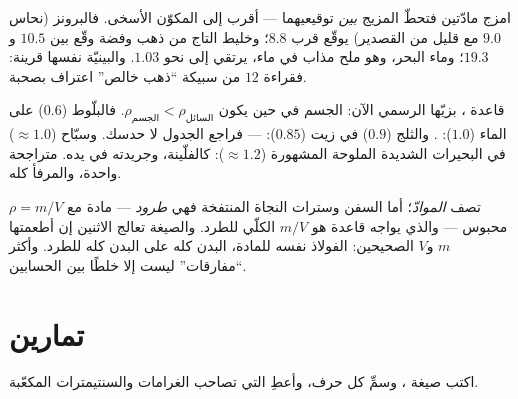 \begin{example}\label{ex:g7:volume-mass-density:alloys}
امزج مادّتين فتحطّ  المزيج \emph{بين} توقيعيهما --- أقرب
إلى المكوّن الأسخى. فالبرونز (نحاس $9.0$ مع قليل من القصدير)
يوقّع قرب $8.8$؛ وخليط التاج من ذهب وفضة وقّع بين $10.5$
و$19.3$؛ وماء البحر، وهو ملح مذاب في ماء، يرتقي إلى نحو $1.03$.
والبينيّة نفسها قرينة: فقراءة $12$ من سبيكة ``ذهب خالص''
اعتراف بصحبة.
\end{example}

\begin{example}\label{ex:g7:volume-mass-density:floating}
قاعدة ، بزيّها الرسمي الآن:  الجسم في  حين يكون
$\rho_{\text{الجسم}} < \rho_{\text{السائل}}$. فالبلّوط ($0.6$)
على الماء ($1.0$): . والثلج ($0.9$) في زيت ($0.85$): 
--- فراجع الجدول لا حدسك. وسبّاح ($\approx 1.0$) في البحيرات
الشديدة الملوحة المشهورة ($\approx 1.2$):  كالفلّينة،
وجريدته في يده. متراجحة واحدة، والمرفأ كله.
\end{example}

\begin{remark}\label{rem:g7:volume-mass-density:parcel}
$\rho = m/V$ تصف \emph{الموادّ}؛ أما السفن وسترات النجاة
المنتفخة فهي \emph{طرود} --- مادة مع  محبوس --- والذي يواجه
قاعدة  هو $m/V$ الكلّي للطرد. والصيغة تعالج الاثنين إن
أطعمتها $m$ و$V$ الصحيحين:  الفولاذ نفسه للمادة، 
البدن كله على  البدن كله للطرد. وأكثر ``مفارقات'' 
ليست إلا خلطًا بين الحسابين.
\end{remark}

\section{تمارين}

\begin{exercise}[$\star$]\label{exo:g7:volume-mass-density:1}
اكتب صيغة ، وسمِّ كل حرف، وأعطِ  التي تصاحب
الغرامات والسنتيمترات المكعّبة.
\end{exercise}

